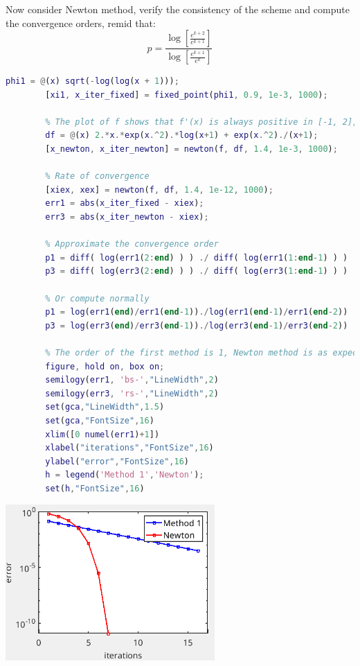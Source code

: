         Now consider Newton method, verify the consistency of the scheme and compute the convergence orders, remid that:
        $$
        p=\frac{
            \log\left[
                \frac{e^{k+2}}{e^{k+1}}
            \right]
        }{
            \log\left[
                \frac{e^{k+1}}{e^k}
            \right]
        }
        $$
        \begin{lstlisting}[language=Matlab, escapeinside=`', gobble=8]
        phi1 = @(x) sqrt(-log(log(x + 1)));
        [xi1, x_iter_fixed] = fixed_point(phi1, 0.9, 1e-3, 1000);
        
        % The plot of f shows that f'(x) is always positive in [-1, 2], therefore the method is locally convergent.
        df = @(x) 2.*x.*exp(x.^2).*log(x+1) + exp(x.^2)./(x+1);
        [x_newton, x_iter_newton] = newton(f, df, 1.4, 1e-3, 1000);
        
        % Rate of convergence
        [xiex, xex] = newton(f, df, 1.4, 1e-12, 1000);
        err1 = abs(x_iter_fixed - xiex);
        err3 = abs(x_iter_newton - xiex);
        
        % Approximate the convergence order
        p1 = diff( log(err1(2:end) ) ) ./ diff( log(err1(1:end-1) ) )
        p3 = diff( log(err3(2:end) ) ) ./ diff( log(err3(1:end-1) ) ) 
        
        % Or compute normally
        p1 = log(err1(end)/err1(end-1))./log(err1(end-1)/err1(end-2))
        p3 = log(err3(end)/err3(end-1))./log(err3(end-1)/err3(end-2))
        
        % The order of the first method is 1, Newton method is as expected of second order.
        figure, hold on, box on;
        semilogy(err1, 'bs-',"LineWidth",2)
        semilogy(err3, 'rs-',"LineWidth",2)
        set(gca,"LineWidth",1.5)
        set(gca,"FontSize",16)
        xlim([0 numel(err1)+1])
        xlabel("iterations","FontSize",16)
        ylabel("error","FontSize",16)
        h = legend('Method 1','Newton');
        set(h,"FontSize",16)
        \end{lstlisting}
        \begin{center}
            \includegraphics[width=0.6\textwidth]{images/code_fixed_bisector3.png}            
        \end{center}


